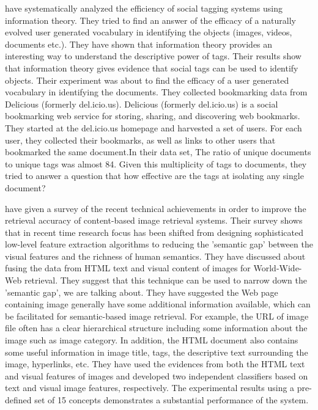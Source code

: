 
\citet*{chi2008understanding} have systematically analyzed the efficiency of social tagging systems using information theory. They tried to find an answer of the efficacy of a naturally evolved user generated vocabulary in identifying the objects (images, videos, documents etc.). They have shown that information theory provides an interesting way to understand the descriptive power of tags. Their results show that information theory gives evidence that social tags can be used to identify objects. Their experiment was about to find the efficacy of a user generated vocabulary in identifying the documents. They collected bookmarking data from Delicious (formerly del.icio.us). Delicious (formerly del.icio.us) is a social bookmarking web service for storing, sharing, and discovering web bookmarks. They started at the del.icio.us homepage and harvested a set of users. For each user, they collected their bookmarks, as well as links to other users that bookmarked the same document.In their data set, The ratio of unique documents to unique tags was almost 84. Given this multiplicity of tags to documents, they tried to answer a question that how effective are the tags at isolating any single document? 

\citet*{liu} have given a survey  of the recent technical achievements in order to improve the retrieval accuracy of content-based image retrieval systems.  Their survey shows that in recent time research focus has been shifted from designing sophisticated low-level feature extraction algorithms to reducing the 'semantic gap' between the visual features and the richness of human semantics.  They have discussed about fusing the data from HTML text and visual content of images for World-Wide-Web retrieval. They suggest that this  technique can be used to narrow down the 'semantic gap', we are talking about. They have suggested the Web page containing image generally have some additional information available, which can be facilitated for semantic-based image retrieval. For example, the URL of
image file often has a clear hierarchical structure including some information about the image such as image category. In addition, the HTML document also contains some useful information in image title, tags, the descriptive text surrounding the image, hyperlinks, etc. They have used the evidences from both the HTML text and visual features of images and developed two independent classifiers based on
text and visual image features, respectively. The experimental results using a pre-defined set of 15 concepts demonstrates a substantial performance of the system.


